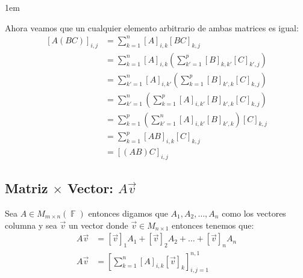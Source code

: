 \documentclass[12pt, fleqn]{report}                             %
\newenvironment{SmallIndentation}[1][0.75em]                    %
        {\begin{adjustwidth}{#1}{}\begin{footnotesize}}             %
        {\end{footnotesize}\end{adjustwidth}}                       %
\theoremstyle{break}                                            %
\DeclareMathOperator \GenericField {\mathbb{F}}                 %
\newcommand{\Brackets}[1]{\left[ #1 \right]}                    %
\newcommand{\Wrap}[1]{\left( #1 \right)}                        %
\begin{document}
\begin{itemize}
\begin{SmallIndentation}[1em]
                            Ahora veamos que un cualquier elemento arbitrario de ambas matrices es igual:
                            \begin{equation*}
                            \begin{split}
                                [A(BC)]_{i, j}    
                                    &= \sum_{k=1}^n [A]_{i, k} [BC]_{k, j}                                      \\
                                    &= \sum_{k=1}^n [A]_{i, k}   \Wrap{\sum_{k'=1}^p [B]_{k, k'} [C]_{k', j} }  \\
                                    &= \sum_{k'=1}^n [A]_{i, k'} \Wrap{\sum_{k=1}^p  [B]_{k', k} [C]_{k, j} }   \\
                                    &= \sum_{k'=1}^n \Wrap{\sum_{k=1}^p [A]_{i, k'} [B]_{k', k} [C]_{k, j} }    \\
                                    &= \sum_{k=1}^p \Wrap{\sum_{k'=1}^n [A]_{i,k'} [B]_{k',k} } [C]_{k, j}      \\
                                    &= \sum_{k=1}^p [AB]_{i, k} [C]_{k, j}                                      \\
                                    &= [(AB)C]_{i, j}
                            \end{split}
                            \end{equation*}

                        \end{SmallIndentation}

                \end{itemize}




            \clearpage
            \subsection{Matriz $\times$ Vector: $A\vec{v}$}
                
                Sea $A \in M_{m \times n}(\GenericField)$ entonces digamos que $A_1, A_2, \dots, A_n$
                como los vectores columna y sea $\vec{v}$ un vector donde $\vec{v} \in M_{n \times 1}$
                entonces tenemos que:
                \begin{align*}
                    A\vec{v} &= [\vec{v}]_1 A_1 + [\vec{v}]_2 A_2 + \dots + [\vec{v}]_n A_n             \\
                    A\vec{v} &= \Brackets{ \sum_{k=1}^{n} [A]_{i, k} [\vec{v}]_k }_{i, j = 1}^{n, 1}
                \end{align*}
\end{document}

